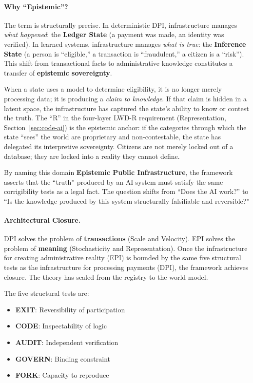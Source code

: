 \documentclass{article}
\theoremstyle{definition}
\begin{document}
\paragraph{Why ``Epistemic''?} The term is structurally precise. In deterministic DPI, infrastructure manages \textit{what happened}: the \textbf{Ledger State} (a payment was made, an identity was verified). In learned systems, infrastructure manages \textit{what is true}: the \textbf{Inference State} (a person is ``eligible,'' a transaction is ``fraudulent,'' a citizen is a ``risk''). This shift from transactional facts to administrative knowledge constitutes a transfer of \textbf{epistemic sovereignty}.

When a state uses a model to determine eligibility, it is no longer merely processing data; it is producing a \textit{claim to knowledge}. If that claim is hidden in a latent space, the infrastructure has captured the state's ability to know or contest the truth. The ``R'' in the four-layer LWD-R requirement (Representation, Section~\ref{sec:code-ai}) is the epistemic anchor: if the categories through which the state ``sees'' the world are proprietary and non-contestable, the state has delegated its interpretive sovereignty. Citizens are not merely locked out of a database; they are locked into a reality they cannot define.

By naming this domain \textbf{Epistemic Public Infrastructure}, the framework asserts that the ``truth'' produced by an AI system must satisfy the same corrigibility tests as a legal fact. The question shifts from ``Does the AI work?'' to ``Is the knowledge produced by this system structurally falsifiable and reversible?''

\paragraph{Architectural Closure.} DPI solves the problem of \textbf{transactions} (Scale and Velocity). EPI solves the problem of \textbf{meaning} (Stochasticity and Representation). Once the infrastructure for creating administrative reality (EPI) is bounded by the same five structural tests as the infrastructure for processing payments (DPI), the framework achieves closure. The theory has scaled from the registry to the world model.

The five structural tests are:

\begin{itemize}[noitemsep]
    \item \textbf{EXIT}: Reversibility of participation
    \item \textbf{CODE}: Inspectability of logic
    \item \textbf{AUDIT}: Independent verification
    \item \textbf{GOVERN}: Binding constraint
    \item \textbf{FORK}: Capacity to reproduce
\end{itemize}
\end{document}
